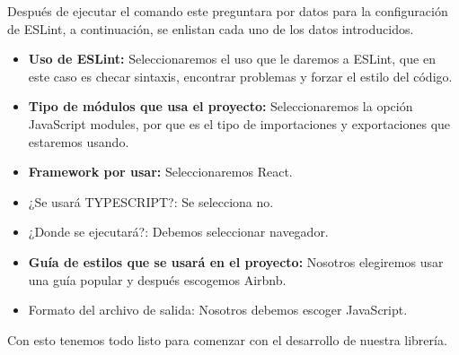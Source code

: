     \newline
    \newline
    Después de ejecutar el comando este preguntara por datos para la configuración de ESLint, a continuación, se enlistan cada uno de los datos introducidos.
    \begin{itemize}
    \item \textbf{Uso de ESLint:  }Seleccionaremos el uso que le daremos a ESLint, que en este caso es checar sintaxis, encontrar problemas y forzar el estilo del código.
    \item \textbf{Tipo de módulos que usa el proyecto:} Seleccionaremos la opción JavaScript modules, por que es el tipo de importaciones y exportaciones que estaremos usando.
    \item \textbf{Framework por usar: }Seleccionaremos React.
    \item ¿Se usará TYPESCRIPT?: Se selecciona no. 
    \item ¿Donde se ejecutará?: Debemos seleccionar navegador.
    \item \textbf{Guía de estilos que se usará en el proyecto: } Nosotros elegiremos usar una guía popular  y después escogemos Airbnb.
    \item Formato del archivo de salida: Nosotros debemos escoger JavaScript.
    \end{itemize}
    Con esto tenemos todo listo para comenzar con el desarrollo de nuestra librería.
    \newpage
